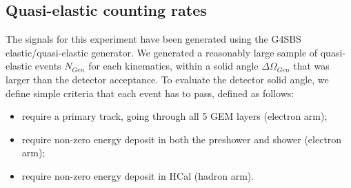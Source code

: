 \subsection{Quasi-elastic counting rates}

The signals for this experiment have been generated using the G4SBS elastic/quasi-elastic generator. 
We generated a reasonably large sample of quasi-elastic events $N_{Gen}$ for each kinematics, within a solid angle $\Delta\Omega_{Gen}$ that was larger than the detector acceptance.
To evaluate the detector solid angle, we define simple criteria that each event has to pass, defined as follows:
%
\begin{itemize}
\item{require a primary track, going through all 5 GEM layers (electron arm);}
\item{require non-zero energy deposit in both the preshower and shower (electron arm);}
\item{require non-zero energy deposit in HCal (hadron arm).}
\end{itemize}
%

